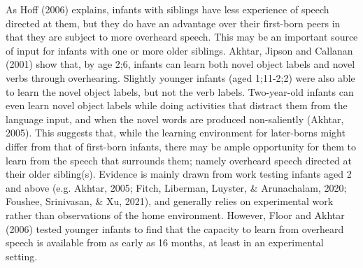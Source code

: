 \documentclass[
  man,mask,floatsintext]{apa6}
\begin{document}
As Hoff (2006) explains, infants with siblings have less experience of speech directed at them, but they do have an advantage over their first-born peers in that they are subject to more overheard speech. This may be an important source of input for infants with one or more older siblings. Akhtar, Jipson and Callanan (2001) show that, by age 2;6, infants can learn both novel object labels and novel verbs through overhearing. Slightly younger infants (aged 1;11-2;2) were also able to learn the novel object labels, but not the verb labels. Two-year-old infants can even learn novel object labels while doing activities that distract them from the language input, and when the novel words are produced non-saliently (Akhtar, 2005). This suggests that, while the learning environment for later-borns might differ from that of first-born infants, there may be ample opportunity for them to learn from the speech that surrounds them; namely overheard speech directed at their older sibling(s). Evidence is mainly drawn from work testing infants aged 2 and above (e.g. Akhtar, 2005; Fitch, Liberman, Luyster, \& Arunachalam, 2020; Foushee, Srinivasan, \& Xu, 2021), and generally relies on experimental work rather than observations of the home environment. However, Floor and Akhtar (2006) tested younger infants to find that the capacity to learn from overheard speech is available from as early as 16 months, at least in an experimental setting.
\end{document}
